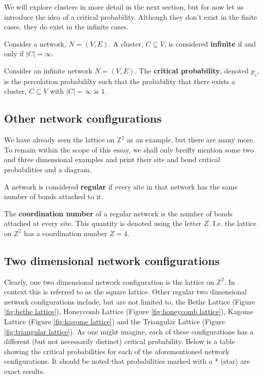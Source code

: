 We will explore clusters in more detail in the next section, but for now let us introduce the idea of a critical probability. Although they don't exist in the finite cases, they do
exist in the infinite cases. 

\begin{definition}\label{def:infinite cluster}
  Consider a network, $N = (V, E)$. A cluster, $C \subseteq V$, is considered \textbf{infinite} if and only if $|C| = \infty$.
\end{definition}

\begin{definition}\label{def:critical probability}
  Consider an infinite network $N = (V, E)$. The \textbf{critical probability}, denoted $p_c$, is the percolation probabililty such that the probability that there exists a
  cluster, $C \subseteq V$ with $|C| = \infty$ is $1$.
\end{definition}

\subsection{Other network configurations}
We have already seen the lattice on $\mathbb{Z}^2$ as an example, but there are many more. To remain within the scope of this essay, we shall only breifly mention some two and
three dimensional examples and print their site and bond critical probabilities and a diagram.

\begin{definition}
  A network is considered \textbf{regular} if every site in that network has the same number of bonds attached to it.
\end{definition}

\begin{definition}
  The \textbf{coordination number} of a regular network is the number of bonds attached at every site. This quantity is denoted using the letter $Z$. I.e. the lattice on
  $\mathbb{Z}^2$ has a coordination number $Z = 4$. 
\end{definition}

\subsection*{Two dimensional network configurations}
Clearly, one two dimensional network configuration is the lattice on $\mathbb{Z}^2$. In context this is referred to as the square lattice. Other regular two dimensional network configurations include, but are not limited to, the Bethe Lattice (Figure \ref{fig:bethe lattice}), Honeycomb
Lattice (Figure \ref{fig:honeycomb lattice}), Kagome Lattice (Figure \ref{fig:kagome lattice}) and the Triangular Lattice (Figure \ref{fig:triangular lattice}). As one might
imagine, each of these configurations has a different (but not necessarily distinct) critical probability. Below is a table showing the critical probabilities for each of the
aforementioned network configurations. It should be noted that probabilities marked with a * (star) are exact results. \cite[p. 11]{Sahimi}

